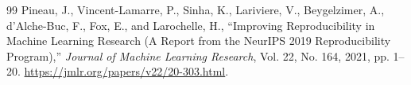 \documentclass[11pt,a4paper]{article}
\begin{document}
\begin{thebibliography}{99}
 Pineau, J., Vincent-Lamarre, P., Sinha, K., Lariviere, V., Beygelzimer, A., d'Alche-Buc, F., Fox, E., and Larochelle, H., ``Improving Reproducibility in Machine Learning Research (A Report from the NeurIPS 2019 Reproducibility Program),'' \emph{Journal of Machine Learning Research}, Vol. 22, No. 164, 2021, pp. 1--20. \url{https://jmlr.org/papers/v22/20-303.html}.
\end{thebibliography}

\endgroup
\end{document}
